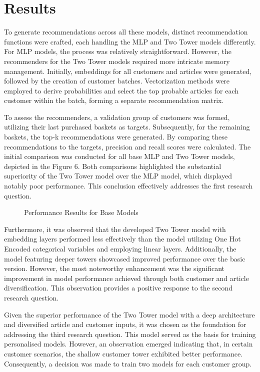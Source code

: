 \documentclass[conference,compsoc]{IEEEtran}
\begin{document}
\section{Results}
To generate recommendations across all these models, distinct recommendation functions were crafted, each handling the MLP and Two Tower models differently. For MLP models, the process was relatively straightforward. However, the recommenders for the Two Tower models required more intricate memory management. Initially, embeddings for all customers and articles were generated, followed by the creation of customer batches. Vectorization methods were employed to derive probabilities and select the top probable articles for each customer within the batch, forming a separate recommendation matrix.

To assess the recommenders, a validation group of customers was formed, utilizing their last purchased baskets as targets. Subsequently, for the remaining baskets, the top-k recommendations were generated. By comparing these recommendations to the targets, precision and recall scores were calculated. The initial comparison was conducted for all base MLP and Two Tower models, depicted in the Figure 6. Both comparisons highlighted the substantial superiority of the Two Tower model over the MLP model, which displayed notably poor performance. This conclusion effectively addresses the first research question.
\begin{figure}[htbp]
    \centering
    \caption{Performance Results for Base Models}
    \label{fig:example}
\end{figure}
Furthermore, it was observed that the developed Two Tower model with embedding layers performed less effectively than the model utilizing One Hot Encoded categorical variables and employing linear layers. Additionally, the model featuring deeper towers showcased improved performance over the basic version. However, the most noteworthy enhancement was the significant improvement in model performance achieved through both customer and article diversification. This observation provides a positive response to the second research question.

Given the superior performance of the Two Tower model with a deep architecture and diversified article and customer inputs, it was chosen as the foundation for addressing the third research question. This model served as the basis for training personalised models. However, an observation emerged indicating that, in certain customer scenarios, the shallow customer tower exhibited better performance. Consequently, a decision was made to train two models for each customer group.
\end{document}
